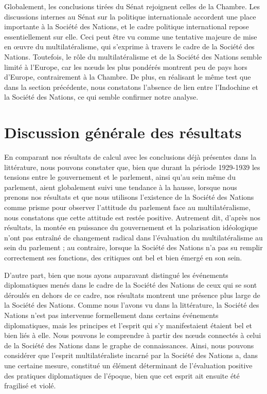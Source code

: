 \documentclass[a4paper,twoside,12pt]{book}
\begin{document}
Globalement, les conclusions tirées du Sénat rejoignent celles de la Chambre. Les discussions internes au Sénat sur la politique internationale accordent une place importante à la Société des Nations, et le cadre politique international repose essentiellement sur elle. Ceci peut être vu comme une tentative majeure de mise en œuvre du multilatéralisme, qui s'exprime à travers le cadre de la Société des Nations. Toutefois, le rôle du multilatéralisme et de la Société des Nations semble limité à l'Europe, car les nœuds les plus pondérés montrent peu de pays hors d'Europe, contrairement à la Chambre. De plus, en réalisant le même test que dans la section précédente, nous constatons l'absence de lien entre l'Indochine et la Société des Nations, ce qui semble confirmer notre analyse.
\section{Discussion générale des résultats}

En comparant nos résultats de calcul avec les conclusions déjà présentes dans la littérature, nous pouvons constater que, bien que durant la période 1929-1939 les tensions entre le gouvernement et le parlement, ainsi qu'au sein même du parlement, aient globalement suivi une tendance à la hausse, lorsque nous prenons nos résultats et que nous utilisons l'existence de la Société des Nations comme prisme pour observer l'attitude du parlement face au multilatéralisme, nous constatons que cette attitude est restée positive. Autrement dit, d'après nos résultats, la montée en puissance du gouvernement et la polarisation idéologique n'ont pas entraîné de changement radical dans l'évaluation du multilatéralisme au sein du parlement ; au contraire, lorsque la Société des Nations n'a pas su remplir correctement ses fonctions, des critiques ont bel et bien émergé en son sein.

D'autre part, bien que nous ayons auparavant distingué les événements diplomatiques menés dans le cadre de la Société des Nations de ceux qui se sont déroulés en dehors de ce cadre, nos résultats montrent une présence plus large de la Société des Nations. Comme nous l'avons vu dans la littérature, la Société des Nations n'est pas intervenue formellement dans certains événements diplomatiques, mais les principes et l'esprit qui s'y manifestaient étaient bel et bien liés à elle. Nous pouvons le comprendre à partir des nœuds connectés à celui de la Société des Nations dans le graphe de connaissances. Ainsi, nous pouvons considérer que l'esprit multilatéraliste incarné par la Société des Nations a, dans une certaine mesure, constitué un élément déterminant de l'évaluation positive des pratiques diplomatiques de l'époque, bien que cet esprit ait ensuite été fragilisé et violé.
\end{document}
